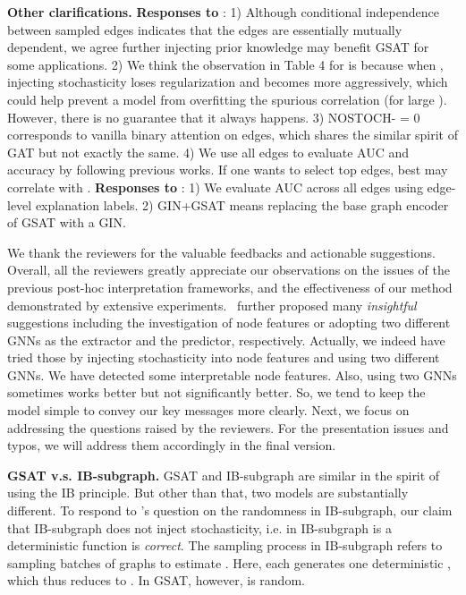 \documentclass{article}
\begin{document}
\textbf{Other clarifications.} 
\textbf{Responses to} \Rt: 1) Although conditional independence between sampled edges indicates that the edges are essentially mutually dependent, we agree further injecting prior knowledge may benefit GSAT for some applications. 
2) We think the observation in Table 4 for  is because when , injecting stochasticity loses regularization and becomes more aggressively, which could help prevent a model from overfitting the spurious correlation (for large ). However, there is no guarantee that it always happens. 3) NOSTOCH- = 0 corresponds to vanilla binary attention on edges, which shares the similar spirit of GAT but not exactly the same.
4) We use all edges to evaluate AUC and accuracy by following previous works. If one wants to select top  edges, best  may correlate with . 
\textbf{Responses to} \Rv: 1) We evaluate AUC across all edges using edge-level explanation labels.
2) GIN+GSAT means replacing the base graph encoder of GSAT with a GIN.








\newpage
We thank the reviewers for the valuable feedbacks and actionable suggestions. Overall, all the reviewers greatly appreciate our observations on the issues of the previous post-hoc interpretation frameworks, and the effectiveness of our method demonstrated by extensive experiments. \Rv~further proposed many \emph{insightful} suggestions including the investigation of node features or adopting two different GNNs as the extractor and the predictor, respectively. Actually, we indeed have tried those by injecting stochasticity into node features and using two different GNNs. We have detected some interpretable node features. Also, using two GNNs sometimes works better but not significantly better. So, we tend to keep the model simple to convey our key messages more clearly. Next, we focus on addressing the questions raised by the reviewers. For the presentation issues and typos, we will address them accordingly in the final version.   

\textbf{GSAT v.s. IB-subgraph.} GSAT and IB-subgraph are similar in the spirit of using the IB principle. But other than that, two models are substantially different. To respond to \Rt's question on the randomness in IB-subgraph, our claim that IB-subgraph does not inject stochasticity, i.e.  in IB-subgraph is a deterministic function is \emph{correct}. The sampling process in IB-subgraph refers to sampling batches of graphs  to estimate . Here, each  generates one deterministic , which thus reduces  to . In GSAT, however,  is random.
\end{document}
